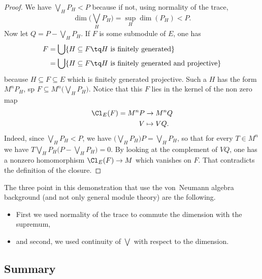 \begin{proof}
We have $\bigvee_HP_H<P$ because if not, using normality of the trace,
\begin{equation}
	\dim\big( \bigvee_HP_H \big)=\sup_H\dim(P_H)<P.
\end{equation}
Now let $Q=P-\bigvee_HP_H$. If $F$ is some submodule of $E$, one has
\begin{equation}
\begin{split}
    F&=\bigcup\{ H\subseteq F\tq H\text{ is finitely generated} \}\\
    &=\bigcup\{ H\subseteq F\tq H\text{ is finitely generated and projective} \}\\
\end{split}
\end{equation}
because $H\subseteq F\subseteq E$ which is finitely generated projective. Such a $H$ has the form $M^nP_H$, sp $F\subseteq M^n\big( \bigvee_HP_H \big)$. Notice that this $F$ lies in the kernel of the non zero map
\begin{equation}
\begin{aligned}
 \Cl_E(F)=M^nP&\to M^nQ \\
   V&\mapsto VQ.
\end{aligned}
\end{equation}
Indeed, since $\bigvee_HP_H<P$, we have $\big( \bigvee_HP_H \big)P=\bigvee_HP_H$, so that for every $T\in M^n$ we have $T\bigvee_HP_H\big( P-\bigvee_HP_H \big)=0$. By looking at the complement of $VQ$, one has a nonzero homomorphism $ \Cl_E(F)\to M$ which vanishes on $F$. That contradicts the definition of the closure.

\end{proof}

The three point in this demonstration that use the von~Neumann algebra background (and not only general module theory) are the following.
\begin{itemize}
\item First we used normality of the trace to commute the dimension with the supremum,
\item and second, we used continuity of $\bigvee$ with respect to the dimension.
\end{itemize}

					\subsection{Summary}

